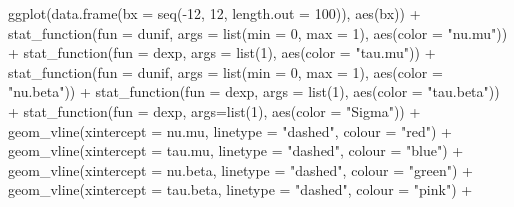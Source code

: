 \documentclass[
]{article}
\newenvironment{Shaded}{\begin{snugshade}}{\end{snugshade}}
\newcommand{\AttributeTok}[1]{\textcolor[rgb]{0.77,0.63,0.00}{#1}}
\newcommand{\DecValTok}[1]{\textcolor[rgb]{0.00,0.00,0.81}{#1}}
\newcommand{\FunctionTok}[1]{\textcolor[rgb]{0.00,0.00,0.00}{#1}}
\newcommand{\NormalTok}[1]{#1}
\newcommand{\SpecialCharTok}[1]{\textcolor[rgb]{0.00,0.00,0.00}{#1}}
\newcommand{\StringTok}[1]{\textcolor[rgb]{0.31,0.60,0.02}{#1}}
\begin{document}
\begin{Shaded}
\begin{Highlighting}[]
\FunctionTok{ggplot}\NormalTok{(}\FunctionTok{data.frame}\NormalTok{(}\AttributeTok{bx =} \FunctionTok{seq}\NormalTok{(}\SpecialCharTok{{-}}\DecValTok{12}\NormalTok{, }\DecValTok{12}\NormalTok{, }\AttributeTok{length.out =} \DecValTok{100}\NormalTok{)), }\FunctionTok{aes}\NormalTok{(bx)) }\SpecialCharTok{+}
  \FunctionTok{stat\_function}\NormalTok{(}\AttributeTok{fun =}\NormalTok{ dunif, }\AttributeTok{args =} \FunctionTok{list}\NormalTok{(}\AttributeTok{min =} \DecValTok{0}\NormalTok{, }\AttributeTok{max =} \DecValTok{1}\NormalTok{), }\FunctionTok{aes}\NormalTok{(}\AttributeTok{color =} \StringTok{"nu.mu"}\NormalTok{)) }\SpecialCharTok{+} 
  \FunctionTok{stat\_function}\NormalTok{(}\AttributeTok{fun =}\NormalTok{ dexp, }\AttributeTok{args =} \FunctionTok{list}\NormalTok{(}\DecValTok{1}\NormalTok{), }\FunctionTok{aes}\NormalTok{(}\AttributeTok{color =} \StringTok{"tau.mu"}\NormalTok{)) }\SpecialCharTok{+} 
  \FunctionTok{stat\_function}\NormalTok{(}\AttributeTok{fun =}\NormalTok{ dunif, }\AttributeTok{args =} \FunctionTok{list}\NormalTok{(}\AttributeTok{min =} \DecValTok{0}\NormalTok{, }\AttributeTok{max =} \DecValTok{1}\NormalTok{), }\FunctionTok{aes}\NormalTok{(}\AttributeTok{color =} \StringTok{"nu.beta"}\NormalTok{)) }\SpecialCharTok{+} 
  \FunctionTok{stat\_function}\NormalTok{(}\AttributeTok{fun =}\NormalTok{ dexp, }\AttributeTok{args =} \FunctionTok{list}\NormalTok{(}\DecValTok{1}\NormalTok{), }\FunctionTok{aes}\NormalTok{(}\AttributeTok{color =} \StringTok{"tau.beta"}\NormalTok{)) }\SpecialCharTok{+} 
  \FunctionTok{stat\_function}\NormalTok{(}\AttributeTok{fun =}\NormalTok{ dexp, }\AttributeTok{args=}\FunctionTok{list}\NormalTok{(}\DecValTok{1}\NormalTok{), }\FunctionTok{aes}\NormalTok{(}\AttributeTok{color =} \StringTok{"Sigma"}\NormalTok{)) }\SpecialCharTok{+}
  \FunctionTok{geom\_vline}\NormalTok{(}\AttributeTok{xintercept =}\NormalTok{ nu.mu, }\AttributeTok{linetype =} \StringTok{"dashed"}\NormalTok{, }\AttributeTok{colour =} \StringTok{"red"}\NormalTok{) }\SpecialCharTok{+}
  \FunctionTok{geom\_vline}\NormalTok{(}\AttributeTok{xintercept =}\NormalTok{ tau.mu, }\AttributeTok{linetype =} \StringTok{"dashed"}\NormalTok{, }\AttributeTok{colour =} \StringTok{"blue"}\NormalTok{) }\SpecialCharTok{+}
  \FunctionTok{geom\_vline}\NormalTok{(}\AttributeTok{xintercept =}\NormalTok{ nu.beta, }\AttributeTok{linetype =} \StringTok{"dashed"}\NormalTok{, }\AttributeTok{colour =} \StringTok{"green"}\NormalTok{) }\SpecialCharTok{+}
  \FunctionTok{geom\_vline}\NormalTok{(}\AttributeTok{xintercept =}\NormalTok{ tau.beta, }\AttributeTok{linetype =} \StringTok{"dashed"}\NormalTok{, }\AttributeTok{colour =} \StringTok{"pink"}\NormalTok{) }\SpecialCharTok{+}

\end{Highlighting}
\end{Shaded}
\end{document}
